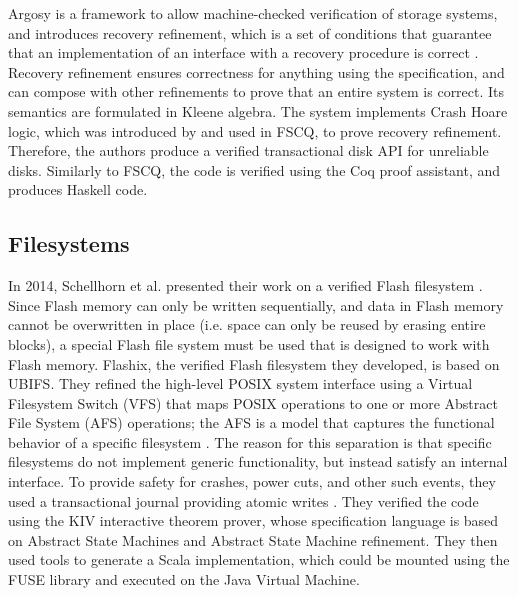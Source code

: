 Argosy is a framework to allow machine-checked verification of storage systems, and introduces recovery refinement, which is a set of conditions that guarantee that an implementation of an interface with a recovery procedure is correct \cite{chajed2019}.
Recovery refinement ensures correctness for anything using the specification, and can compose with other refinements to prove that an entire system is correct.
Its semantics are formulated in Kleene algebra.
The system implements Crash Hoare logic, which was introduced by and used in FSCQ, to prove recovery refinement.
Therefore, the authors produce a verified transactional disk API for unreliable disks.
Similarly to FSCQ, the code is verified using the Coq proof assistant, and produces Haskell code.

\subsection{Filesystems}
In 2014, Schellhorn et al. presented their work on a verified Flash filesystem \cite{schellhorn2014}.
Since Flash memory can only be written sequentially, and data in Flash memory cannot be overwritten in place (i.e. space can only be reused by erasing entire blocks), a special Flash file system must be used that is designed to work with Flash memory.
Flashix, the verified Flash filesystem they developed, is based on UBIFS.
They refined the high-level POSIX system interface using a Virtual Filesystem Switch (VFS) that maps POSIX operations to one or more Abstract File System (AFS) operations; the AFS is a model that captures the functional behavior of a specific filesystem \cite{ernst2012}.
The reason for this separation is that specific filesystems do not implement generic functionality, but instead satisfy an internal interface.
To provide safety for crashes, power cuts, and other such events, they used a transactional journal providing atomic writes \cite{ernst2015}.
They verified the code using the KIV interactive theorem prover, whose specification language is based on Abstract State Machines and Abstract State Machine refinement.
They then used tools to generate a Scala implementation, which could be mounted using the FUSE library and executed on the Java Virtual Machine.

